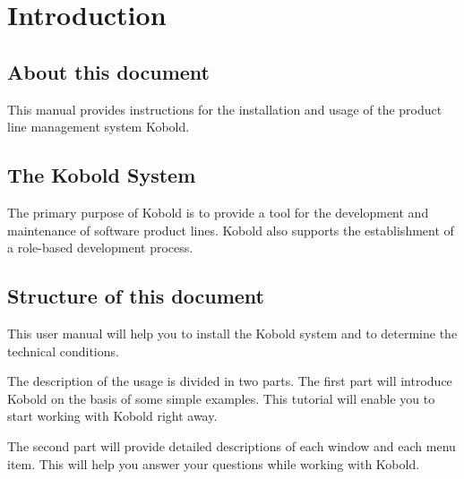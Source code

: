 \chapter{Introduction}

\section{About this document}

This manual provides instructions for the installation and usage of the
product line management system Kobold.

\section{The Kobold System}

The primary purpose of Kobold is to provide a tool for the development
and maintenance of software product lines. Kobold also supports the
establishment of a role-based development process.

\section{Structure of this document}
This user manual will help you to install the Kobold system and to
determine the technical conditions. \par
The description of the usage is divided in two parts. The first part
will introduce Kobold on the basis of some simple examples. This tutorial
will enable you to start working with Kobold right away. \par
The second part will provide detailed descriptions of each window and
each menu item. This will help you answer your questions while working
with Kobold.
